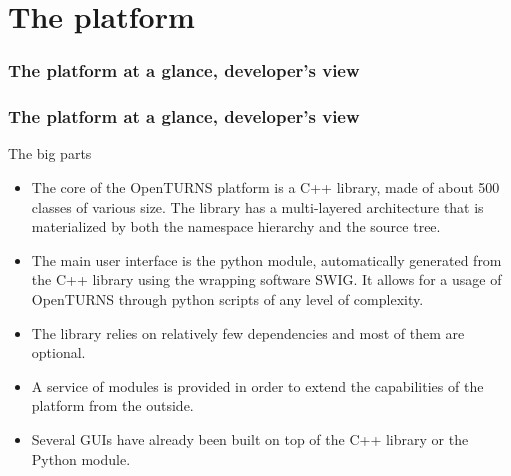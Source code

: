\documentclass[8pt]{beamer}
\begin{document}
\section[The platform]{The platform}
\begin{frame}
  \frametitle{The platform at a glance, developer's view}
  \centering {}
\end{frame}
\begin{frame}
  \frametitle{The platform at a glance, developer's view}
  \begin{block}{The big parts}
    \begin{itemize}
    \item The \alert{core} of the OpenTURNS platform is a \alert{C++ library}, made of about 500 classes of various size. The library has a multi-layered architecture that is materialized by both the namespace hierarchy and the source tree.
    \item The \alert{main user interface} is the \alert{python module}, automatically generated from the C++ library using the wrapping software SWIG. It allows for a usage of OpenTURNS through python scripts of any level of complexity.
    \item The library relies on relatively \alert{few dependencies} and most of them are optional.
    \item A service of \alert{modules} is provided in order to extend the capabilities of the platform from the outside.
    \item Several \alert{GUIs} have already been built on top of the C++ library or the Python module.
    \end{itemize}
  \end{block}
\end{frame}
\end{document}
